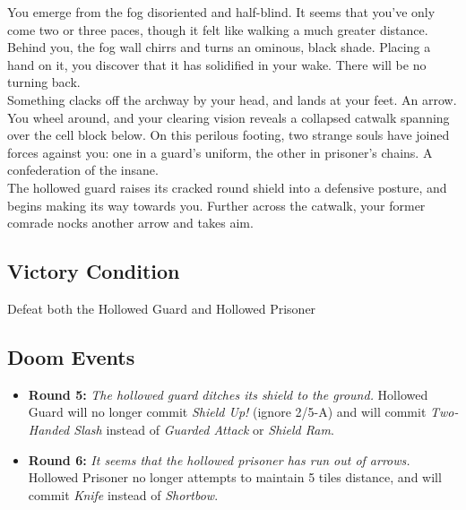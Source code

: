 You emerge from the fog disoriented and half-blind. It seems that you’ve only come two or three paces, though it felt like walking a much greater distance. Behind you, the fog wall chirrs and turns an ominous, black shade. Placing a hand on it, you discover that it has solidified in your wake. There will be no turning back.\\

Something clacks off the archway by your head, and lands at your feet. An arrow. You wheel around, and your clearing vision reveals a collapsed catwalk spanning over the cell block below. On this perilous footing, two strange souls have joined forces against you: one in a guard’s uniform, the other in prisoner’s chains. A confederation of the insane.\\

The hollowed guard raises its cracked round shield into a defensive posture, and begins making its way towards you. Further across the catwalk, your former comrade nocks another arrow and takes aim.

\subsection*{Victory Condition}
Defeat both the Hollowed Guard and Hollowed Prisoner

\subsection*{Doom Events}
\begin{itemize}
\item \textbf{Round 5:} \emph{The hollowed guard ditches its shield to the ground.} Hollowed Guard will no longer commit \emph{Shield Up!} (ignore 2/5-A) and will commit \emph{Two-Handed Slash} instead of \emph{Guarded Attack} or \emph{Shield Ram}.
\item \textbf{Round 6:} \emph{It seems that the hollowed prisoner has run out of arrows.} Hollowed Prisoner no longer attempts to maintain 5 tiles distance, and will commit \emph{Knife} instead of \emph{Shortbow}.
\end{itemize}


